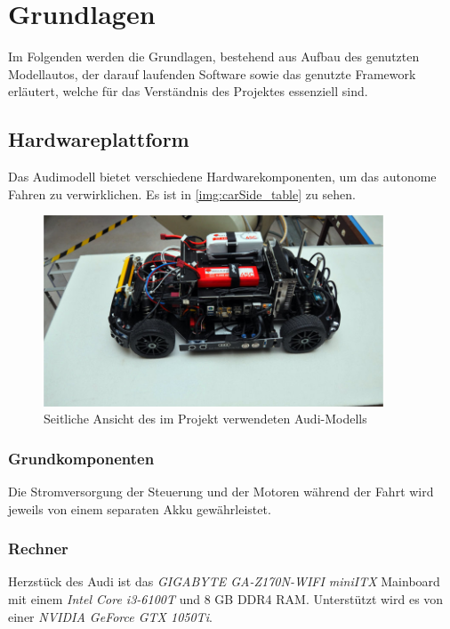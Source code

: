 \documentclass[12pt, a4paper]{scrartcl}
\begin{document}
\newpage
\section{Grundlagen}
Im Folgenden werden die Grundlagen, bestehend aus Aufbau des genutzten Modellautos, der darauf laufenden Software sowie das genutzte Framework erläutert, welche für das Verständnis des Projektes essenziell sind.

\subsection{Hardwareplattform}
Das Audimodell bietet verschiedene Hardwarekomponenten, um das autonome Fahren zu verwirklichen. Es ist in \autoref{img:carSide_table} zu sehen.

\begin{figure}[ht]
	\centering
	\includegraphics[width=0.9\textwidth, keepaspectratio]{Bilder/carSide_table.jpg}
	\caption{Seitliche Ansicht des im Projekt verwendeten Audi-Modells}
	\label{img:carSide_table}
\end{figure}

\subsubsection{Grundkomponenten}
Die Stromversorgung der Steuerung und der Motoren während der Fahrt wird jeweils von einem separaten Akku gewährleistet.

\subsubsection{Rechner}
Herzstück des Audi ist das \emph{GIGABYTE GA-Z170N-WIFI miniITX} Mainboard mit einem \emph{Intel Core i3-6100T} und 8 GB DDR4 RAM. Unterstützt wird es von einer \emph{NVIDIA GeForce GTX 1050Ti}.
\end{document}
